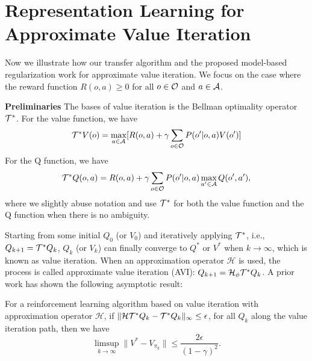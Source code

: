\section{Representation Learning for Approximate Value Iteration}
\label{app:avi}

Now we illustrate how our transfer algorithm and the proposed model-based regularization work for approximate value iteration.
We focus on the case where the reward function $R(o,a)\geq 0$ for all $o\in\mathcal{O}$ and $a\in\mathcal{A}$.

\textbf{Preliminaries}\quad
The bases of value iteration is the Bellman optimality operator $\mathcal{T}^*$. For the value function, we have
\begin{equation}
    \mathcal{T}^* V(o) = \max_{a\in\mathcal{A}} [ R(o,a) + \gamma \sum_{o\in\mathcal{O}} P(o^\prime|o,a) V(o^\prime) ]
\end{equation}
For the Q function, we have
\begin{equation}
    \mathcal{T}^* Q(o,a) =  R(o,a) + \gamma \sum_{o\in\mathcal{O}} P(o^\prime|o,a) \max_{a^\prime\in\mathcal{A}} Q(o^\prime,a^\prime),
\end{equation}
where we slightly abuse notation and use $\mathcal{T}^*$ for both the value function and the Q function when there is no ambiguity. 

Starting from some initial $Q_0$ (or $V_0$) and iteratively applying $\mathcal{T}^*$, i.e., $Q_{k+1}=\mathcal{T}^* Q_k$, $Q_k$ (or $V_k$) can finally converge to $Q^*$ or $V^*$ when $k\to\infty$, which is known as value iteration.
When an approximation operator $\mathcal{H}$ is used, the process is called approximate value iteration (AVI): $Q_{k+1}=\mathcal{H}_{\phi} \mathcal{T}^* Q_k$. A prior work has shown the following asymptotic result:
\begin{lemma}
\label{lem:avi}
For a reinforcement learning algorithm based on value iteration with approximation operator $\mathcal{H}$, if $\|\mathcal{H}\mathcal{T}^* Q_k - \mathcal{T}^* Q_k\|_\infty\leq \epsilon$, for all $Q_k$ along the value iteration path, then we have
\begin{equation}
    \limsup_{k\to\infty} \|V^*-V_{\pi_k}\| \leq \frac{2\epsilon}{(1-\gamma)^2}.
\end{equation}
\end{lemma}


